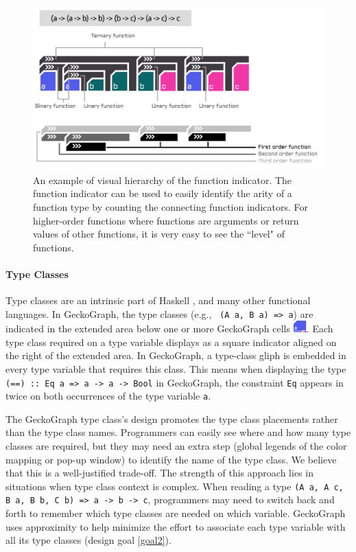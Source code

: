 \documentclass[preprint,12pt]{elsarticle}
\begin{document}
\begin{figure}[h]
  \includegraphics[width=\linewidth]{figures/Indicator}
  \caption{
        \label{fig:indicator}
        An example of visual hierarchy of the function indicator. The function indicator can be used to easily identify the arity of a function type by counting the connecting function indicators. For higher-order functions where functions are arguments or return values of other functions, it is very easy to see the ``level" of functions. 
  }
\end{figure}

 
\paragraph{Type Classes} 
Type classes are an intrinsic part of Haskell \cite{Hudak2007-kn}, and many other functional languages. In GeckoGraph, the type classes (e.g., \texttt{ (A a, B a) => a}) are indicated in the extended area below one or more GeckoGraph cells \includegraphics[height=1.2em]{figures/TypeClass.png}. Each type class required on a type variable displays as a square indicator aligned on the right of the extended area. In GeckoGraph, a type-class gliph is embedded in every type variable that requires this class. This means when displaying the type \texttt{(==) :: Eq a => 
a -> a -> Bool} in GeckoGraph, the constraint \texttt{Eq} appears in twice on both occurrences of the type variable \texttt{a}. 

The GeckoGraph type class's design promotes the type class placements rather than the type class names. Programmers can easily see where and how many type classes are required, but they may need an extra step (global legends of the color mapping or pop-up window) to identify the name of the type class. We believe that this is a well-justified trade-off. The strength of this approach lies in situations when type class context is complex. When reading a type \texttt{(A a, A c, B a, B b, C b) => a -> b -> c}, programmers may need to switch back and forth to remember which type classes are needed on which variable. GeckoGraph uses approximity to help minimize the effort to associate each type variable with all its type classes (design goal \ref{goal2}). 
\end{document}
